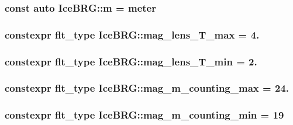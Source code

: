 \hypertarget{namespaceIceBRG_ada6365c5d16106f0608afbd34f010bcc}{
\subsubsection[{m}]{\setlength{\rightskip}{0pt plus 5cm}const auto Ice\-B\-R\-G\-::m = {\bf meter}}}\label{namespaceIceBRG_ada6365c5d16106f0608afbd34f010bcc}
\hypertarget{namespaceIceBRG_a2396686715e28d2b62baac2dfb9021a9}{
\subsubsection[{mag\-\_\-lens\-\_\-\-T\-\_\-max}]{\setlength{\rightskip}{0pt plus 5cm}constexpr {\bf flt\-\_\-type} Ice\-B\-R\-G\-::mag\-\_\-lens\-\_\-\-T\-\_\-max = 4.}}\label{namespaceIceBRG_a2396686715e28d2b62baac2dfb9021a9}
\hypertarget{namespaceIceBRG_ac8678d1f61a28341bc7157159256bb3b}{
\subsubsection[{mag\-\_\-lens\-\_\-\-T\-\_\-min}]{\setlength{\rightskip}{0pt plus 5cm}constexpr {\bf flt\-\_\-type} Ice\-B\-R\-G\-::mag\-\_\-lens\-\_\-\-T\-\_\-min = 2.}}\label{namespaceIceBRG_ac8678d1f61a28341bc7157159256bb3b}
\hypertarget{namespaceIceBRG_ac6de07edf41f9e5c1c7e8c5f1689f17c}{
\subsubsection[{mag\-\_\-m\-\_\-counting\-\_\-max}]{\setlength{\rightskip}{0pt plus 5cm}constexpr {\bf flt\-\_\-type} Ice\-B\-R\-G\-::mag\-\_\-m\-\_\-counting\-\_\-max = 24.}}\label{namespaceIceBRG_ac6de07edf41f9e5c1c7e8c5f1689f17c}
\hypertarget{namespaceIceBRG_a94be0eaeb0bfcdc8dae4a1aa020b5e60}{
\subsubsection[{mag\-\_\-m\-\_\-counting\-\_\-min}]{\setlength{\rightskip}{0pt plus 5cm}constexpr {\bf flt\-\_\-type} Ice\-B\-R\-G\-::mag\-\_\-m\-\_\-counting\-\_\-min = 19}}\label{namespaceIceBRG_a94be0eaeb0bfcdc8dae4a1aa020b5e60}
